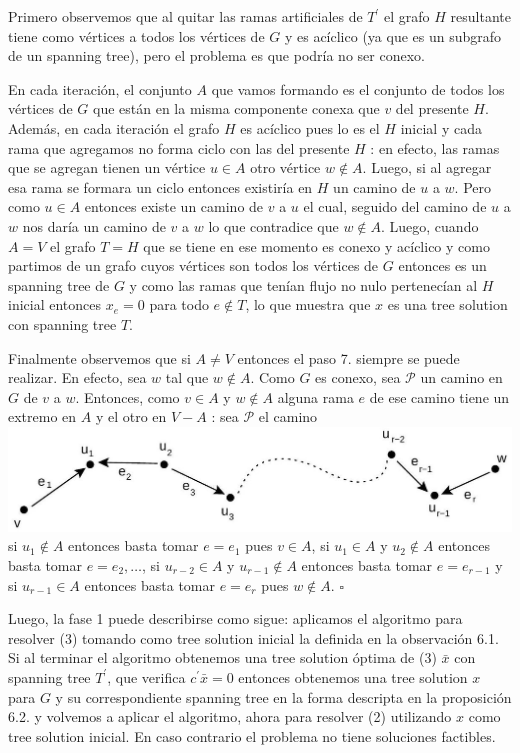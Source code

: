 \documentclass[10pt]{article}
\begin{document}
Primero observemos que al quitar las ramas artificiales de $T^{\prime}$ el grafo $H$ resultante tiene como vértices a todos los vértices de $G$ y es acíclico (ya que es un subgrafo de un spanning tree), pero el problema es que podría no ser conexo.

En cada iteración, el conjunto $A$ que vamos formando es el conjunto de todos los vértices de $G$ que están en la misma componente conexa que $v$ del presente $H$. Además, en cada iteración el grafo $H$ es acíclico pues lo es el $H$ inicial y cada rama que agregamos no forma ciclo con las del presente $H$ : en efecto, las ramas que se agregan tienen un vértice $u \in A$ otro vértice $w \notin A$. Luego, si al agregar esa rama se formara un ciclo entonces existiría en $H$ un camino de $u$ a $w$. Pero como $u \in A$ entonces existe un camino de $v$ a $u$ el cual, seguido del camino de $u$ a $w$ nos daría un camino de $v$ a $w$ lo que contradice que $w \notin A$. Luego, cuando $A=V$ el grafo $T=H$ que se tiene en ese momento es conexo y acíclico y como partimos de un grafo cuyos vértices son todos los vértices de $G$ entonces es un spanning tree de $G$ y como las ramas que tenían flujo no nulo pertenecían al $H$ inicial entonces $x_{e}=0$ para todo $e \notin T$, lo que muestra que $x$ es una tree solution con spanning tree $T$.

Finalmente observemos que si $A \neq V$ entonces el paso 7. siempre se puede realizar. En efecto, sea $w$ tal que $w \notin A$. Como $G$ es conexo, sea $\mathcal{P}$ un camino en $G$ de $v$ a $w$. Entonces, como $v \in A$ y $w \notin A$ alguna rama $e$ de ese camino tiene un extremo en $A$ y el otro en $V-A$ : sea $\mathcal{P}$ el camino\\
\includegraphics[max width=\textwidth, center]{2025_09_05_955b52bfc43174a24a9ag-27}\\
si $u_{1} \notin A$ entonces basta tomar $e=e_{1}$ pues $v \in A$, si $u_{1} \in A$ y $u_{2} \notin A$ entonces basta tomar $e=e_{2}, \ldots$, si $u_{r-2} \in A$ y $u_{r-1} \notin A$ entonces basta tomar $e=e_{r-1}$ y si $u_{r-1} \in A$ entonces basta tomar $e=e_{r}$ pues $w \notin A$. $\square$

Luego, la fase 1 puede describirse como sigue: aplicamos el algoritmo para resolver (3) tomando como tree solution inicial la definida en la observación 6.1.\\
Si al terminar el algoritmo obtenemos una tree solution óptima de (3) $\bar{x}$ con spanning tree $T^{\prime}$, que verifica $c^{\prime} \bar{x}=0$ entonces obtenemos una tree solution $x$ para $G$ y su correspondiente spanning tree en la forma descripta en la proposición 6.2. y volvemos a aplicar el algoritmo, ahora para resolver (2) utilizando $x$ como tree solution inicial. En caso contrario el problema no tiene soluciones factibles.
\end{document}
